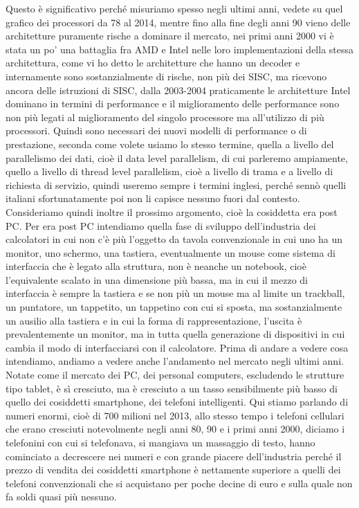 Questo è significativo perché misuriamo spesso negli ultimi anni, vedete su quel grafico dei processori da 78 al 2014, mentre fino alla fine degli anni 90 vieno delle architetture puramente rische a dominare il mercato, nei primi anni 2000 vi è stata un po' una battaglia fra AMD e Intel nelle loro implementazioni della stessa architettura, come vi ho detto le architetture che hanno un decoder e internamente sono sostanzialmente di rische, non più dei SISC, ma ricevono ancora delle istruzioni di SISC, dalla 2003-2004 praticamente le architetture Intel dominano in termini di performance e il miglioramento delle performance sono non più legati al miglioramento del singolo processore ma all'utilizzo di più processori.
Quindi sono necessari dei nuovi modelli di performance o di prestazione, seconda come volete usiamo lo stesso termine, quella a livello del parallelismo dei dati, cioè il data level parallelism, di cui parleremo ampiamente, quello a livello di thread level parallelism, cioè a livello di trama e a livello di richiesta di servizio, quindi useremo sempre i termini inglesi, perché sennò quelli italiani sfortunatamente poi non li capisce nessuno fuori dal contesto.
Consideriamo quindi inoltre il prossimo argomento, cioè la cosiddetta era post PC.
Per era post PC intendiamo quella fase di sviluppo dell'industria dei calcolatori in cui non c'è più l'oggetto da tavola convenzionale in cui uno ha un monitor, uno schermo, una tastiera, eventualmente un mouse come sistema di interfaccia che è legato alla struttura, non è neanche un notebook, cioè l'equivalente scalato in una dimensione più bassa, ma in cui il mezzo di interfaccia è sempre la tastiera e se non più un mouse ma al limite un trackball, un puntatore, un tappetito, un tappetino con cui si sposta, ma sostanzialmente un ausilio alla tastiera e in cui la forma di rappresentazione, l'uscita è prevalentemente un monitor, ma in tutta quella generazione di dispositivi in cui cambia il modo di interfacciarsi con il calcolatore.
Prima di andare a vedere cosa intendiamo, andiamo a vedere anche l'andamento nel mercato negli ultimi anni.
Notate come il mercato dei PC, dei personal computers, escludendo le strutture tipo tablet, è sì cresciuto, ma è cresciuto a un tasso sensibilmente più basso di quello dei cosiddetti smartphone, dei telefoni intelligenti.
Qui stiamo parlando di numeri enormi, cioè di 700 milioni nel 2013, allo stesso tempo i telefoni cellulari che erano cresciuti notevolmente negli anni 80, 90 e i primi anni 2000, diciamo i telefonini con cui si telefonava, si mangiava un massaggio di testo, hanno cominciato a decrescere nei numeri e con grande piacere dell'industria perché il prezzo di vendita dei cosiddetti smartphone è nettamente superiore a quelli dei telefoni convenzionali che si acquistano per poche decine di euro e sulla quale non fa soldi quasi più nessuno.
